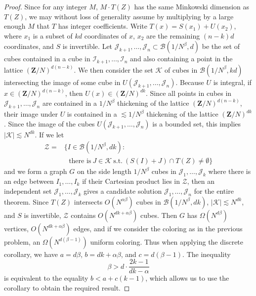 \documentclass{article}
\theoremstyle{plain}
\theoremstyle{plain}
\begin{document}
\begin{proof}
	Since for any integer $M$, $M \cdot T(Z)$ has the same Minkowski dimension as $T(Z)$, we may without loss of generality assume by multiplying by a large enough $M$ that $T$ has integer coefficients. Write $T(x) = S(x_1) + U(x_2)$, where $x_1$ is a subset of $kd$ coordinates of $x$, $x_2$ are the remaining $(n-k)d$ coordinates, and $S$ is invertible. Let $\mathcal{J}_{k+1}, \dots, \mathcal{J}_n \subset \mathcal{B}(1/N^\beta,d)$ be the set of cubes contained in a cube in $\mathcal{I}_{k+1}, \dots, \mathcal{I}_n$ and also containing a point in the lattice $(\mathbf{Z}/N)^{d(n-k)}$. We then consider the set $\mathcal{K}$ of cubes in $\mathcal{B}(1/N^\beta,kd)$ intersecting the image of some cube in $U(\mathcal{J}_{k+1}, \dots, \mathcal{J}_n)$. Because $U$ is integral, if $x \in (\mathbf{Z}/N)^{d(n-k)}$, then $U(x) \in (\mathbf{Z}/N)^{dk}$. Since all points in cubes in $\mathcal{J}_{k+1}, \dots, \mathcal{J}_n$ are contained in a $1/N^\beta$ thickening of the lattice $(\mathbf{Z}/N)^{d(n-k)}$, their image under $U$ is contained in a $\lesssim 1/N^\beta$ thickening of the lattice $(\mathbf{Z}/N)^{dk}$. Since the image of the cubes $U(\mathcal{J}_{k+1}, \dots, \mathcal{J}_n)$ is a bounded set, this implies $|\mathcal{K}| \lesssim N^{dk}$. If we let
	\begin{align*}
		\mathcal{Z} = &\{ I \in \mathcal{B}(1/N^\beta,dk):\\
		&\ \ \ \text{there is}\ J \in \mathcal{K}\ \text{s.t.}\ (S(I) + J) \cap T(Z) \neq \emptyset \}
	\end{align*}
	and we form a graph $G$ on the side length $1/N^\beta$ cubes in $\mathcal{J}_1, \dots, \mathcal{J}_k$ where there is an edge between $I_1, \dots, I_k$ if their Cartesian product lies in $\mathcal{Z}$, then an independent set $\mathcal{J}_1, \dots, \mathcal{J}_k$ gives a candidate solution $\mathcal{J}_1, \dots, \mathcal{J}_n$ for the entire theorem. Since $T(Z)$ intersects $O(N^{\alpha \beta})$ cubes in $\mathcal{B}(1/N^\beta,dk)$, $|\mathcal{K}| \lesssim N^{dk}$, and $S$ is invertible, $\mathcal{Z}$ contains $O(N^{dk + \alpha \beta})$ cubes. Then $G$ has $\Omega(N^{d \beta})$ vertices, $O(N^{dk + \alpha \beta})$ edges, and if we consider the coloring as in the previous problem, an $\Omega(N^{d(\beta - 1)})$ uniform coloring. Thus when applying the discrete corollary, we have $a = d \beta$, $b = dk + \alpha \beta$, and $c = d(\beta - 1)$. The inequality
	\[ \beta > d \cdot \frac{2k - 1}{dk - \alpha} \]
	is equivalent to the equality $b < a + c(k-1)$, which allows us to use the corollary to obtain the required result.
\end{proof}
\end{document}
